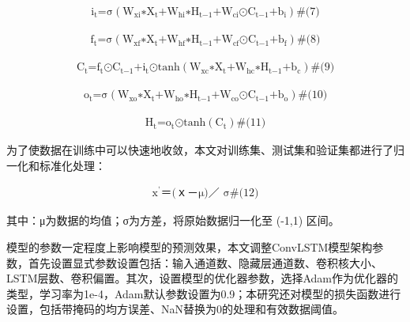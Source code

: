 \documentclass[
  12pt,
]{article}
\begin{document}
\[\begin{array}{r}
\text{i}_{\text{t}}\text{=σ}\left( \text{W}_{\text{xi}}\text{∗}\text{X}_{\text{t}}\text{+}\text{W}_{\text{hi}}\text{∗}\text{H}_{\text{t−1}}\text{+}\text{W}_{\text{ci}}\text{⊙}\text{C}_{\text{t−1}}\text{+}\text{b}_{\text{i}} \right)\#\text{(7)}
\end{array}\]

\[\begin{array}{r}
\text{f}_{\text{t}}\text{=σ}\left( \text{W}_{\text{xf}}\text{∗}\text{X}_{\text{t}}\text{+}\text{W}_{\text{hf}}\text{∗}\text{H}_{\text{t−1}}\text{+}\text{W}_{\text{cf}}\text{⊙}\text{C}_{\text{t−1}}\text{+}\text{b}_{\text{f}} \right)\#\text{(8)}
\end{array}\]

\[\begin{array}{r}
\text{C}_{\text{t}}\text{=}\text{f}_{\text{t}}\text{⊙}\text{C}_{\text{t−1}}\text{+}\text{i}_{\text{t}}\text{⊙}\text{tanh}\left( \text{W}_{\text{xc}}\text{∗}\text{X}_{\text{t}}\text{+}\text{W}_{\text{hc}}\text{∗}\text{H}_{\text{t−1}}\text{+}\text{b}_{\text{c}} \right)\#\text{(9)}
\end{array}\]

\[\begin{array}{r}
\text{o}_{\text{t}}\text{=σ}\left( \text{W}_{\text{xo}}\text{∗}\text{X}_{\text{t}}\text{+}\text{W}_{\text{ho}}\text{∗}\text{H}_{\text{t−1}}\text{+}\text{W}_{\text{co}}\text{⊙}\text{C}_{\text{t−1}}\text{+}\text{b}_{\text{o}} \right)\#\text{(10)}
\end{array}\]

\[\begin{array}{r}
\text{H}_{\text{t}}\text{=}\text{o}_{\text{t}}\text{⊙}\text{tanh}\left( \text{C}_{\text{t}} \right)\#\text{(11)}
\end{array}\]

为了使数据在训练中可以快速地收敛，本文对训练集、测试集和验证集都进行了归一化和标准化处理：

\[\begin{array}{r}
\text{x}^{\text{'}}\text{＝}\text{(}\text{ｘ－μ}\text{)}\text{／ σ}\#\text{(1}\text{2}\text{)}
\end{array}\]

其中：μ为数据的均值；σ为方差，将原始数据归一化至 (-1,1) 区间。

模型的参数一定程度上影响模型的预测效果，本文调整ConvLSTM模型架构参数，首先设置显式参数设置包括：输入通道数、隐藏层通道数、卷积核大小、LSTM层数、卷积偏置。其次，设置模型的优化器参数，选择Adam作为优化器的类型，学习率为1e-4，Adam默认参数设置为0.9；本研究还对模型的损失函数进行设置，包括带掩码的均方误差、NaN替换为0的处理和有效数据阈值。
\end{document}
